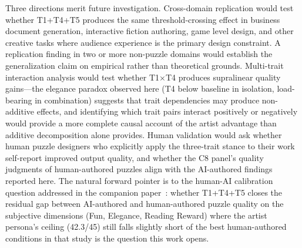 Three directions merit future investigation. Cross-domain replication would test whether T1+T4+T5 produces the same threshold-crossing effect in business document generation, interactive fiction authoring, game level design, and other creative tasks where audience experience is the primary design constraint. A replication finding in two or more non-puzzle domains would establish the generalization claim on empirical rather than theoretical grounds. Multi-trait interaction analysis would test whether T1$\times$T4 produces supralinear quality gains---the elegance paradox observed here (T4 below baseline in isolation, load-bearing in combination) suggests that trait dependencies may produce non-additive effects, and identifying which trait pairs interact positively or negatively would provide a more complete causal account of the artist advantage than additive decomposition alone provides. Human validation would ask whether human puzzle designers who explicitly apply the three-trait stance to their work self-report improved output quality, and whether the C8 panel's quality judgments of human-authored puzzles align with the AI-authored findings reported here. The natural forward pointer is to the human-AI calibration question addressed in the companion paper~\cite{dellaLibera2025panel}: whether T1+T4+T5 closes the residual gap between AI-authored and human-authored puzzle quality on the subjective dimensions (Fun, Elegance, Reading Reward) where the artist persona's ceiling (42.3/45) still falls slightly short of the best human-authored conditions in that study is the question this work opens.
